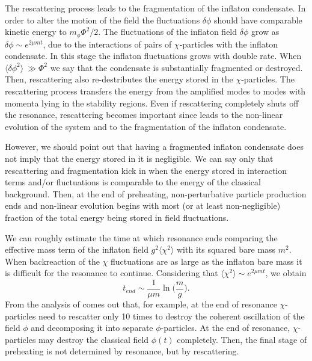 \documentclass[11pt,a4paper,twoside]{book}
\begin{document}
 The rescattering process leads to the fragmentation of the inflaton condensate. In  order to alter the motion of the field the fluctuations $ \delta \phi $ should have comparable kinetic energy to $ m_{\phi}\Phi^{2}/2 $. The fluctuations of the inflaton field $\delta \phi $ grow as $\delta \phi \sim e^{2\mu m t}$, due to the interactions of pairs of $\chi$-particles with the inflaton condensate. In this stage the inflaton fluctuations grows with double rate. When $ \langle \delta \phi^{2}\rangle \ \gg \Phi^{2}  $ we say that the condensate is substantially fragmented or destroyed. Then, rescattering also re-destributes the energy stored in the $\chi$-particles. The rescattering process transfers the energy from the amplified  modes to modes with momenta lying in the stability regions. Even if rescattering completely shuts off the resonance, rescattering becomes important since leads to the non-linear evolution of the system and to the fragmentation of the inflaton condensate.
 
 However, we should point out that having a fragmented inflaton condensate does not imply that the energy stored in it is negligible. We can say only that rescattering and fragmentation kick in when the energy stored in interaction terms and/or fluctuations is comparable to the energy of the classical background. Then, at the end of preheating, non-perturbative particle production ends and non-linear evolution begins with most (or at least non-negligible) fraction of the total energy being stored in field fluctuations.
 
  We can roughly estimate the time at which resonance ends comparing the effective mass term of the inflaton field $ g^{2}\langle \chi^{2}\rangle  $ with its squared bare mass $ m^{2} $. When  backreaction of the $\chi$ fluctuations are as large as the inflaton bare mass it is difficult for the resonance to continue. Considering that $ \langle \chi^{2}\rangle  \sim e^{2\mu m t} $, we obtain
 \begin{equation}
t_{end} \sim \frac{1}{\mu m}\ln\Bigg(\frac{m}{g}\Bigg).
 \end{equation}
 From the analysis of \cite{Chap4:LindePreheatingModel} comes out that, for example, at the end of resonance $\chi$-particles need to rescatter only 10 times to destroy the coherent oscillation of the field $\phi$ and decomposing it into separate $\phi$-particles. At the end of resonance, $\chi$-particles may destroy the classical field $\phi(t)$ completely. Then, the final stage of preheating is not determined by resonance, but by rescattering.  
 
\end{document}
